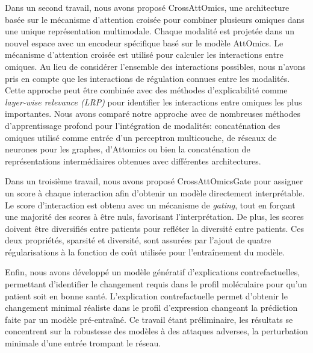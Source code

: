 Dans un second travail, nous avons proposé CrossAttOmics, une architecture basée sur le mécanisme d'attention croisée pour combiner plusieurs omiques dans une unique représentation multimodale.
Chaque modalité est projetée dans un nouvel espace avec un encodeur spécifique basé sur le modèle AttOmics.
Le mécanisme d'attention croisée est utilisé pour calculer les interactions entre omiques.
Au lieu de considérer l'ensemble des interactions possibles, nous n'avons pris en compte que les interactions de régulation connues entre les modalités.
Cette approche peut être combinée avec des méthodes d'explicabilité comme \textit{layer-wise relevance (LRP)} pour identifier les interactions entre omiques les plus importantes.
Nous avons comparé notre approche avec de nombreuses méthodes d'apprentissage profond pour l'intégration de modalités: concaténation des omiques utilisé comme entrée d'un perceptron multicouche, de réseaux de neurones pour les graphes, d'Attomics ou bien la concaténation de représentations intermédiaires obtenues avec différentes architectures.

Dans un troisième travail, nous avons proposé CrossAttOmicsGate pour assigner un score à chaque interaction afin d'obtenir un modèle directement interprétable.
Le score d'interaction est obtenu avec un mécanisme de \textit{gating}, tout en forçant une majorité des scores à être nuls, favorisant l'interprétation.
De plus, les scores doivent être diversifiés entre patients pour refléter la diversité entre patients.
Ces deux propriétés, sparsité et diversité, sont assurées par l'ajout de quatre régularisations à la fonction de coût utilisée pour l'entraînement du modèle.

Enfin, nous avons développé un modèle génératif d'explications contrefactuelles, permettant d'identifier le changement requis dans le profil moléculaire pour qu'un patient soit en bonne santé.
L'explication contrefactuelle permet d'obtenir le changement minimal réaliste dans le profil d'expression changeant la prédiction faite par un modèle pré-entraîné.
Ce travail étant préliminaire, les résultats se concentrent sur la robustesse des modèles à des attaques adverses, la perturbation minimale d'une entrée trompant le réseau.
